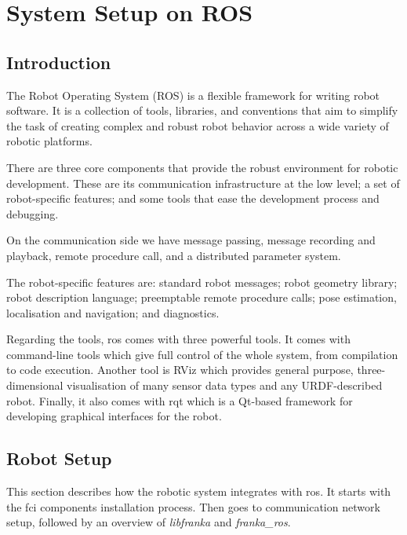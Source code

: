 \chapter{System Setup on ROS}
\label{app:ros_setup}

\section{Introduction}
\label{sec:ros_setup_introduction}

The Robot Operating System (ROS) is a flexible framework for writing robot software. It is a collection of tools, libraries, and conventions that aim to simplify the task of creating complex and robust robot behavior across a wide variety of robotic platforms.

There are three core components that provide the robust environment for robotic development. These are its communication infrastructure at the low level; a set of robot-specific features; and some tools that ease the development process and debugging.

On the communication side we have message passing, message recording and playback, remote procedure call, and a distributed parameter system.

The robot-specific features are: standard robot messages; robot geometry library; robot description language; preemptable remote procedure calls; pose estimation, localisation and navigation; and diagnostics.

Regarding the tools, \gls{ros} comes with three powerful tools. It comes with command-line tools which give full control of the whole system, from compilation to code execution. Another tool is RViz which provides general purpose, three-dimensional visualisation of many sensor data types and any URDF-described robot. Finally, it also comes with rqt which is a Qt-based framework for developing graphical interfaces for the robot.

\section{Robot Setup}
\label{sec:ros_setup_robot}

This section describes how the robotic system integrates with \gls{ros}. It starts with the \gls{fci} components installation process. Then goes to communication network setup, followed by an overview of \textit{libfranka} and \textit{franka\_ros}.

